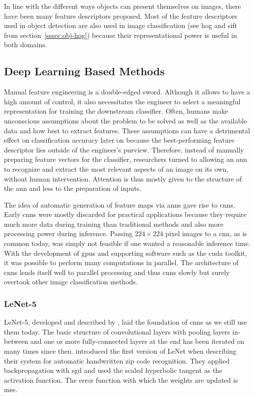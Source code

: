 \documentclass[draft,final]{vutinfth} %
\begin{document}
In line with the different ways objects can present themselves on
images, there have been many feature descriptors proposed. Most of the
feature descriptors used in object detection are also used in image
classification (see \gls{hog} and \gls{sift} from
section~\ref{sssec:obj-hog}) because their representational power is
useful in both domains.

\subsection{Deep Learning Based Methods}
\label{ssec:class-dl}

Manual feature engineering is a double-edged sword. Although it allows
to have a high amount of control, it also necessitates the engineer to
select a meaningful representation for training the downstream
classifier. Often, humans make unconscious assumptions about the
problem to be solved as well as the available data and how best to
extract features. These assumptions can have a detrimental effect on
classification accuracy later on because the best-performing feature
descriptor lies outside of the engineer's purview. Therefore, instead
of manually preparing feature vectors for the classifier, researchers
turned to allowing an \gls{ann} to recognize and extract the most
relevant aspects of an image on its own, without human
intervention. Attention is thus mostly given to the structure of the
\gls{ann} and less to the preparation of inputs.

The idea of automatic generation of feature maps via \glspl{ann} gave
rise to \glspl{cnn}. Early \glspl{cnn} \cite{lecun1989} were mostly
discarded for practical applications because they require much more
data during training than traditional methods and also more processing
power during inference. Passing $224\times 224$ pixel images to a
\gls{cnn}, as is common today, was simply not feasible if one wanted a
reasonable inference time. With the development of \glspl{gpu} and
supporting software such as the \gls{cuda} toolkit, it was possible to
perform many computations in parallel. The architecture of \glspl{cnn}
lends itself well to parallel processing and thus \glspl{cnn} slowly
but surely overtook other image classification methods.

\subsubsection{LeNet-5}
\label{sssec:theory-lenet-5}

LeNet-5, developed and described by \textcite{lecun1998}, laid the
foundation of \glspl{cnn} as we still use them today. The basic
structure of convolutional layers with pooling layers in-between and
one or more fully-connected layers at the end has been iterated on
many times since then. \textcite{lecun1989} introduced the first
version of LeNet when describing their system for automatic
handwritten zip code recognition. They applied backpropagation with
\gls{sgd} and used the scaled hyperbolic tangent as the activation
function. The error function with which the weights are updated is
\gls{mse}.
\end{document}
